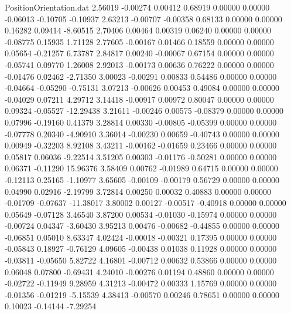 \begin{filecontents}{PositionOrientation.dat}
   2.56019   -0.00274    0.00412     0.68919    0.00000    0.00000   -0.06013   -0.10705   -0.10937
   2.63213   -0.00707   -0.00358     0.68133    0.00000    0.00000    0.16282    0.09414   -8.60515
   2.70406    0.00464    0.00319     0.06240    0.00000    0.00000   -0.08775    0.15935    1.71128
   2.77605   -0.00167    0.01466     0.18559    0.00000    0.00000    0.05654   -0.21257    6.73787
   2.84817    0.00240   -0.00067     0.67154    0.00000    0.00000   -0.05741    0.09770    1.26008
   2.92013   -0.00173    0.00636     0.76222    0.00000    0.00000   -0.01476    0.02462   -2.71350
   3.00023   -0.00291    0.00833     0.54486    0.00000    0.00000   -0.04664   -0.05290   -0.75131
   3.07213   -0.00626    0.00453     0.49084    0.00000    0.00000   -0.04029    0.07211    4.29712
   3.14418   -0.00917    0.00972     0.80047    0.00000    0.00000    0.09324   -0.05527  -12.29438
   3.21611   -0.00246    0.00575    -0.08379    0.00000    0.00000    0.07996   -0.19160    0.41379
   3.28814    0.00330   -0.00805    -0.05399    0.00000    0.00000   -0.07778    0.20340   -4.90910
   3.36014   -0.00230    0.00659    -0.40743    0.00000    0.00000    0.00949   -0.32203    8.92108
   3.43211   -0.00162   -0.01659     0.23466    0.00000    0.00000    0.05817    0.06036   -9.22514
   3.51205    0.00303   -0.01176    -0.50281    0.00000    0.00000    0.06371   -0.11290   15.96376
   3.58409    0.00762   -0.01989     0.64715    0.00000    0.00000   -0.12113    0.25165   -1.10977
   3.65605   -0.00109   -0.00179     0.56729    0.00000    0.00000    0.04990    0.02916   -2.19799
   3.72814    0.00250    0.00032     0.40883    0.00000    0.00000   -0.01709   -0.07637  -11.38017
   3.80002    0.00127   -0.00517    -0.40918    0.00000    0.00000    0.05649   -0.07128    3.46540
   3.87200    0.00534   -0.01030    -0.15974    0.00000    0.00000   -0.00724    0.04347   -3.60430
   3.95213    0.00476   -0.00682    -0.44855    0.00000    0.00000   -0.06851    0.05010    8.63347
   4.02424   -0.00018   -0.00321     0.17395    0.00000    0.00000   -0.05843    0.18927   -0.76129
   4.09605   -0.00438    0.01038     0.11928    0.00000    0.00000   -0.03811   -0.05650    5.82722
   4.16801   -0.00712    0.00632     0.53866    0.00000    0.00000    0.06048    0.07800   -0.69431
   4.24010   -0.00276    0.01194     0.48860    0.00000    0.00000   -0.02722   -0.11949    9.28959
   4.31213   -0.00472    0.00333     1.15769    0.00000    0.00000   -0.01356   -0.01219   -5.15539
   4.38413   -0.00570    0.00246     0.78651    0.00000    0.00000    0.10023   -0.14144   -7.29254

\end{filecontents}
